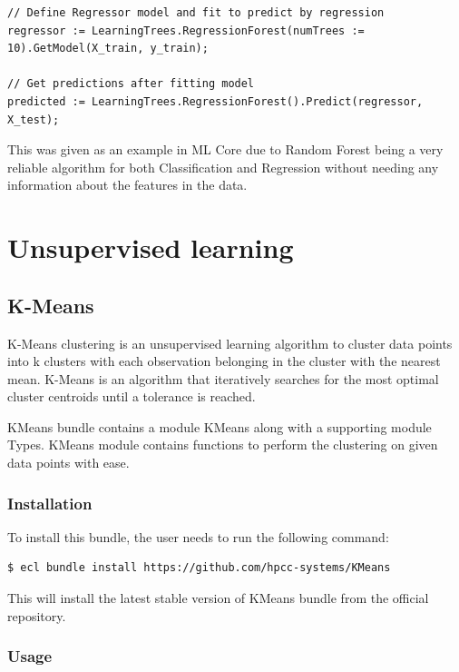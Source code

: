 \begin{lstlisting}
// Define Regressor model and fit to predict by regression
regressor := LearningTrees.RegressionForest(numTrees := 10).GetModel(X_train, y_train);

// Get predictions after fitting model
predicted := LearningTrees.RegressionForest().Predict(regressor, X_test);
\end{lstlisting}

This was given as an example in ML Core due to Random Forest being a very reliable algorithm for both Classification and Regression without needing any information about the features in the data.

\part{Unsupervised learning}\label{part:unsupe}

\chapter{K-Means}\label{unsupe:kmeans}

K-Means clustering is an unsupervised learning algorithm to cluster data points into k clusters with each observation belonging in the cluster with the nearest mean. K-Means is an algorithm that iteratively searches for the most optimal cluster centroids until a tolerance is reached.

KMeans bundle contains a module KMeans along with a supporting module Types. KMeans module contains functions to perform the clustering on given data points with ease.

\section{Installation}

To install this bundle, the user needs to run the following command:

\begin{lstlisting}[language=bash]
$ ecl bundle install https://github.com/hpcc-systems/KMeans
\end{lstlisting}

This will install the latest stable version of KMeans bundle from the official repository.

\section{Usage}

